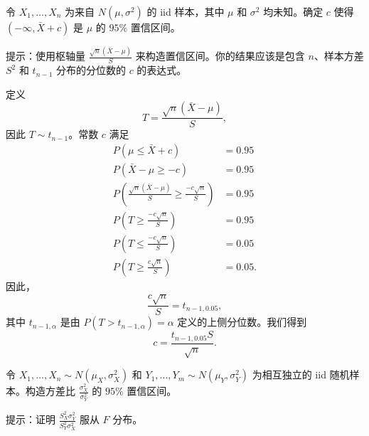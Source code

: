 \begin{questions}
\question 令 $X_1, \dots, X_n$ 为来自 $N(\mu, \sigma^2)$ 的 iid 样本，其中 $\mu$ 和 $\sigma^2$ 均未知。确定 $c$ 使得 $(-\infty, \bar{X} + c)$ 是 $\mu$ 的 $95\%$ 置信区间。

提示：使用枢轴量 $\frac{\sqrt{n}(\bar{X} - \mu)}{S}$ 来构造置信区间。你的结果应该是包含 $n$、样本方差 $S^2$ 和 $t_{n-1}$ 分布的分位数的 $c$ 的表达式。

\begin{solution}
定义
\[
T = \frac{\sqrt{n}(\bar{X} - \mu)}{S},
\]
因此 $T \sim t_{n-1}$。常数 $c$ 满足
\begin{align*}
P(\mu \le \bar{X} + c) &= 0.95 \\
P(\bar{X} - \mu \ge -c) &= 0.95 \\
P\left(\frac{\sqrt{n}(\bar{X} - \mu)}{S} \ge \frac{-c\sqrt{n}}{S}\right) &= 0.95 \\
P\left(T \ge \frac{-c\sqrt{n}}{S}\right) &= 0.95 \\
P\left(T \le \frac{-c\sqrt{n}}{S}\right) &= 0.05 \\
P\left(T \ge \frac{c\sqrt{n}}{S}\right) &= 0.05.
\end{align*}
因此，
\[
\frac{c\sqrt{n}}{S} = t_{n-1, 0.05},
\]
其中 $t_{n-1, \alpha}$ 是由 $P(T > t_{n-1, \alpha}) = \alpha$ 定义的上侧分位数。我们得到
\[
c = \frac{t_{n-1, 0.05}S}{\sqrt{n}}.
\]
\end{solution}

\question 令 $X_1, \dots, X_n \sim N(\mu_X, \sigma_X^2)$ 和 $Y_1, \dots, Y_m \sim N(\mu_Y, \sigma_Y^2)$ 为相互独立的 iid 随机样本。构造方差比 $\frac{\sigma_X^2}{\sigma_Y^2}$ 的 $95\%$ 置信区间。

提示：证明 $\frac{S_X^2 \sigma_Y^2}{S_Y^2 \sigma_X^2}$ 服从 $F$ 分布。


\end{questions}

